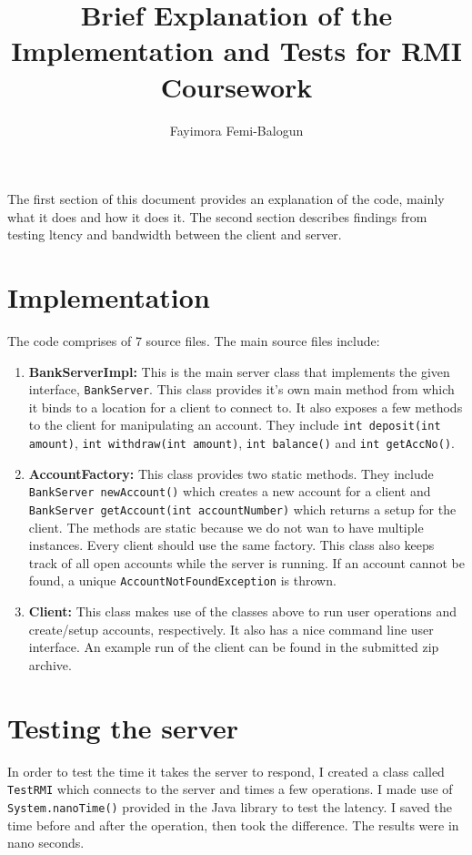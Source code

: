 \documentclass{article}
\title{Brief Explanation of the Implementation and Tests for RMI Coursework}
\author{Fayimora Femi-Balogun}
\begin{document}
\maketitle

The first section of this document provides an explanation of the code, mainly what it does and how it does it. The second section describes findings from testing ltency and bandwidth between the client and server.

\section{Implementation}
The code comprises of 7 source files. The main source files include:

\begin{enumerate}
    \item \textbf{BankServerImpl:} This is the main server class that implements the given interface, \texttt{BankServer}. This class provides it's own main method from which it binds to a location for a client to connect to. It also exposes a few methods to the client for manipulating an account. They include \texttt{int deposit(int amount)}, \texttt{int withdraw(int amount)}, \texttt{int balance()} and \texttt{int getAccNo()}.

    \item \textbf{AccountFactory:} This class provides two static methods. They include \texttt{BankServer newAccount()} which creates a new account for a client and \texttt{BankServer getAccount(int accountNumber)} which returns a setup for the client. The methods are static because we do not wan to have multiple instances. Every client should use the same factory. This class also keeps track of all open accounts while the server is running. If an account cannot be found, a unique \texttt{AccountNotFoundException} is thrown.
    
    \item \textbf{Client:} This class makes use of the classes above to run user operations and create/setup accounts, respectively. It also has a nice command line user interface. An example run of the client can be found in the submitted zip archive.

\end{enumerate}

\section{Testing the server}
In order to test the time it takes the server to respond, I created a class called \texttt{TestRMI} which connects to the server and times a few operations. I made use of \texttt{System.nanoTime()} provided in the Java library to test the latency. I saved the time before and after the operation, then took the difference. The results were in nano seconds.
\end{document}
